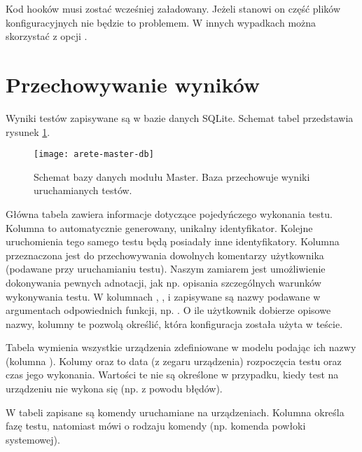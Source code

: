 \documentclass[00-praca-magisterska.tex]{subfiles}
\begin{document}
\begin{textcode}
\end{textcode}

Kod hooków musi zostać wcześniej załadowany. Jeżeli stanowi on część plików
konfiguracyjnych nie będzie to problemem. W innych wypadkach można skorzystać z
opcji .

\section{Przechowywanie wyników}

Wyniki testów zapisywane są w bazie danych SQLite. Schemat tabel przedstawia
rysunek \ref{fig:arete-master-db}.

\begin{figure}[htb]
\begin{center}
\leavevmode
\texttt{[image: arete-master-db]}
\end{center}
\caption{Schemat bazy danych modułu Master. Baza przechowuje wyniki
uruchamianych testów.}
\label{fig:arete-master-db}
\end{figure}

Główna tabela  zawiera informacje dotyczące pojedyńczego wykonania
testu. Kolumna  to automatycznie generowany, unikalny identyfikator.
Kolejne uruchomienia tego samego testu będą posiadały inne identyfikatory.
Kolumna  przeznaczona jest do przechowywania dowolnych komentarzy
użytkownika (podawane przy uruchamianiu testu). Naszym zamiarem jest
umożliwienie dokonywania pewnych adnotacji, jak np. opisania szczególnych
warunków wykonywania testu. W kolumnach , ,
 i  zapisywane są nazwy podawane w argumentach
odpowiednich funkcji, np. . O ile użytkownik
dobierze opisowe nazwy, kolumny te pozwolą określić, która konfiguracja została
użyta w teście.

Tabela  wymienia wszystkie urządzenia zdefiniowane w modelu podając
ich nazwy (kolumna ). Kolumy  oraz 
to data (z zegaru urządzenia) rozpoczęcia testu oraz czas jego wykonania.
Wartości te nie są określone w przypadku, kiedy test na urządzeniu nie wykona
się (np. z powodu błędów).

W tabeli  zapisane są komendy uruchamiane na urządzeniach.
Kolumna  określa fazę testu, natomiast  mówi o rodzaju
komendy (np. komenda powłoki systemowej).
\end{document}
